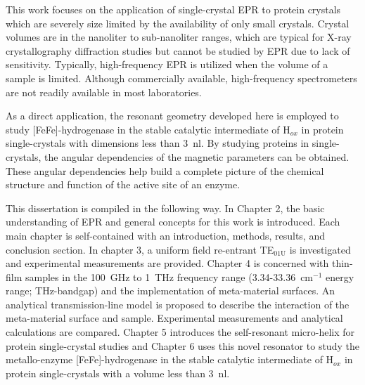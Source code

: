 This work focuses on the application of single-crystal EPR to protein crystals which are severely size limited by the availability of only small crystals. Crystal volumes are in the nanoliter to sub-nanoliter ranges, which are typical for X-ray crystallography diffraction studies but cannot be studied by EPR due to lack of sensitivity. Typically, high-frequency EPR is utilized when the volume of a sample is limited. \cite{grinbergVHF} Although commercially available, high-frequency spectrometers are not readily available in most laboratories.

As a direct application, the resonant geometry developed here is employed to study [FeFe]-hydrogenase in the stable catalytic intermediate of H$_{ox}$ in protein single-crystals with dimensions less than 3~nl. By studying proteins in single-crystals, the angular dependencies of the magnetic parameters can be obtained. These angular dependencies help build a complete picture of the chemical structure and function of the active site of an enzyme.\cite{NiFe1996,NiFe2000,NiFe2003}

This dissertation is compiled in the following way. In Chapter 2, the basic understanding of EPR and general concepts for this work is introduced. Each main chapter is self-contained with an introduction, methods, results, and conclusion section. In chapter 3, a uniform field re-entrant TE$_{\text{01U}}$ is investigated and experimental measurements are provided. Chapter 4 is concerned with thin-film samples in the 100~GHz to 1~THz frequency range (3.34-33.36~cm$^{-1}$ energy range; THz-bandgap) and the implementation of meta-material surfaces. An analytical transmission-line model is proposed to describe the interaction of the meta-material surface and sample. Experimental measurements and analytical calculations are compared. Chapter 5 introduces the self-resonant micro-helix for protein single-crystal studies and Chapter 6 uses this novel resonator to study the metallo-enzyme [FeFe]-hydrogenase in the stable catalytic intermediate of H$_{ox}$ in protein single-crystals with a volume less than 3~nl.

{\renewcommand{\bibsection}{\clearpage\section*{\bibname}\markboth{\bibname}{\bibname}}
\renewcommand{\bibname}{CHAPTER 1. REFERENCES}


}